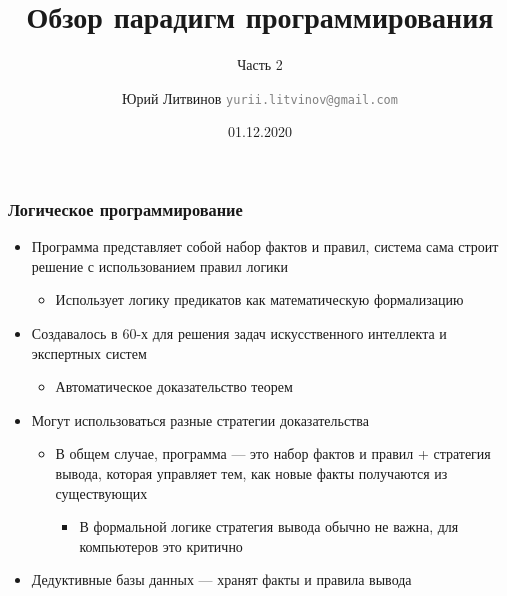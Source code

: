\documentclass[xetex,mathserif,serif]{beamer}
\title{Обзор парадигм программирования}
\subtitle{Часть 2}
\author[Юрий Литвинов]{Юрий Литвинов \newline \textcolor{gray}{\small\texttt{yurii.litvinov@gmail.com}}}
\date{01.12.2020}
\begin{document}
    
    \frame{\titlepage}

    \begin{frame}
        \frametitle{Логическое программирование}
        \begin{itemize}
            \item Программа представляет собой набор фактов и правил, система сама строит решение с использованием правил логики
            \begin{itemize}
                \item Использует логику предикатов как математическую формализацию
            \end{itemize}
            \item Создавалось в 60-х для решения задач искусственного интеллекта и экспертных систем
            \begin{itemize}
                \item Автоматическое доказательство теорем
            \end{itemize}
            \item Могут использоваться разные стратегии доказательства
            \begin{itemize}
                \item В общем случае, программа --- это набор фактов и правил + стратегия вывода, которая управляет тем, как новые факты получаются из существующих
                \begin{itemize}
                    \item В формальной логике стратегия вывода обычно не важна, для компьютеров это критично
                \end{itemize}
            \end{itemize}
            \item Дедуктивные базы данных --- хранят факты и правила вывода
        \end{itemize}
    \end{frame}
\end{document}
